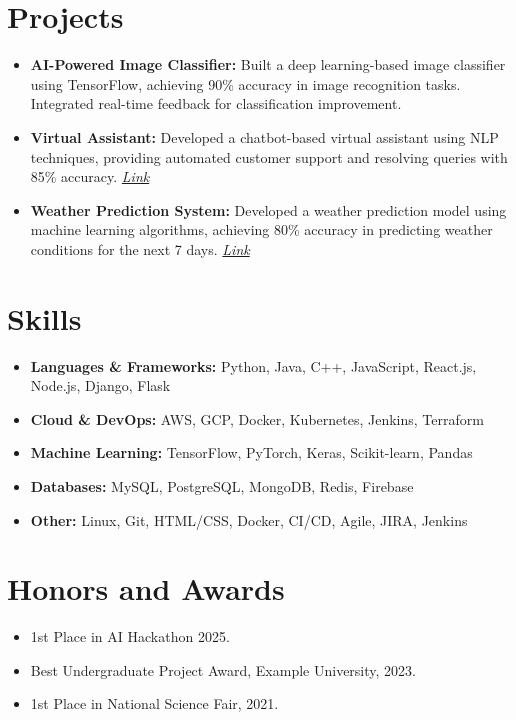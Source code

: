 \documentclass[a4paper,10pt]{article}
\newcommand{\resumeItem}[2]{
  \item\small{
    \textbf{#1}{#2 \vspace{-2pt}}
  }
}
\newcommand{\resumeSubItem}[2]{\resumeItem{#1}{#2}\vspace{-3pt}}
\newcommand{\resumeSubHeadingListStart}{\begin{itemize}[leftmargin=*]}
\newcommand{\resumeSubHeadingListEnd}{\end{itemize}}
\begin{document}
\section{Projects}
\resumeSubHeadingListStart
\resumeSubItem{AI-Powered Image Classifier: }{Built a deep learning-based image classifier using TensorFlow, achieving 90\% accuracy in image recognition tasks. Integrated real-time feedback for classification improvement.}
\vspace{2pt}
\resumeSubItem{Virtual Assistant: }{Developed a chatbot-based virtual assistant using NLP techniques, providing automated customer support and resolving queries with 85\% accuracy. \textit{\href{https://github.com/johndoe/Virtual-Assistant}{Link}}}
\vspace{2pt}
\resumeSubItem{Weather Prediction System: }{Developed a weather prediction model using machine learning algorithms, achieving 80\% accuracy in predicting weather conditions for the next 7 days. \textit{\href{https://github.com/johndoe/Weather-Prediction}{Link}}}
\resumeSubHeadingListEnd

\vspace{0pt}
\section{Skills}
\resumeSubHeadingListStart
    \small %
    \resumeSubItem{Languages \& Frameworks: }{\small Python, Java, C++, JavaScript, React.js, Node.js, Django, Flask}
    \resumeSubItem{Cloud \& DevOps: }{\small AWS, GCP, Docker, Kubernetes, Jenkins, Terraform}
    \resumeSubItem{Machine Learning: }{\small TensorFlow, PyTorch, Keras, Scikit-learn, Pandas}
    \resumeSubItem{Databases: }{\small MySQL, PostgreSQL, MongoDB, Redis, Firebase}
    \resumeSubItem{Other: }{\small Linux, Git, HTML/CSS, Docker, CI/CD, Agile, JIRA, Jenkins}
\resumeSubHeadingListEnd

\vspace{0pt}
\section{Honors and Awards}
\resumeSubHeadingListStart
    \resumeSubItem{}{1st Place in AI Hackathon 2025.}
    \resumeSubItem{}{Best Undergraduate Project Award, Example University, 2023.}
    \resumeSubItem{}{1st Place in National Science Fair, 2021.}
\resumeSubHeadingListEnd
\end{document}
